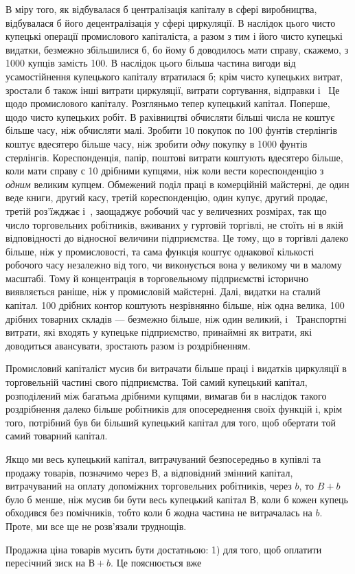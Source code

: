 \parcont{}  %
В міру того, як відбувалася б централізація капіталу в сфері
виробництва, відбувалася б його децентралізація у сфері циркуляції.
В наслідок цього чисто купецькі операції промислового
капіталіста, а разом з тим і його чисто купецькі видатки, безмежно
збільшилися б, бо йому б доводилось мати справу, скажемо,
з 1000 купців замість 100. В наслідок цього більша частина
вигоди від усамостійнення купецького капіталу втратилася б;
крім чисто купецьких витрат, зростали б також інші витрати
циркуляції, витрати сортування, відправки і~ Це щодо промислового
капіталу. Розгляньмо тепер купецький капітал. Поперше,
щодо чисто купецьких робіт. В рахівництві обчисляти
більші числа не коштує більше часу, ніж обчисляти малі. Зробити
10 покупок по 100 фунтів стерлінгів коштує вдесятеро більше
часу, ніж зробити \emph{одну} покупку в 1000 фунтів стерлінгів. Кореспонденція,
папір, поштові витрати коштують вдесятеро більше,
коли мати справу с 10 дрібними купцями, ніж коли вести кореспонденцію
з \emph{одним} великим купцем. Обмежений поділ праці в комерційній
майстерні, де один веде книги, другий касу, третій
кореспонденцію, один купує, другий продає, третій роз’їжджає
і~, заощаджує робочий час у величезних розмірах, так що
число торговельних робітників, вживаних у гуртовій торгівлі,
не стоїть ні в якій відповідності до відносної величини підприємства.
Це тому, що в торгівлі далеко більше, ніж у промисловості,
та сама функція коштує однакової кількості робочого часу
незалежно від того, чи виконується вона у великому чи в малому
масштабі. Тому й концентрація в торговельному підприємстві
історично виявляється раніше, ніж у промисловій майстерні.
Далі, видатки на сталий капітал. 100 дрібних контор коштують
незрівнянно більше, ніж одна велика, 100 дрібних товарних складів
— безмежно більше, ніж один великий, і~ Транспортні витрати,
які входять у купецьке підприємство, принаймні як витрати,
які доводиться авансувати, зростають разом із роздрібненням.

Промисловий капіталіст мусив би витрачати більше праці
і видатків циркуляції в торговельній частині свого підприємства.
Той самий купецький капітал, розподілений між багатьма дрібними
купцями, вимагав би в наслідок такого роздрібнення далеко
більше робітників для опосереднення своїх функцій і, крім
того, потрібний був би більший купецький капітал для того,
щоб обертати той самий товарний капітал.

Якщо ми весь купецький капітал, витрачуваний безпосередньо
в купівлі та продажу товарів, позначимо через $В$, а відповідний
змінний капітал, витрачуваний на оплату допоміжних торговельних
робітників, через $b$, то $B + b$ було б менше, ніж мусив би
бути весь купецький капітал В, коли б кожен купець обходився
без помічників, тобто коли б жодна частина не витрачалась на $b$.
Проте, ми все ще не розв’язали труднощів.

Продажна ціна товарів мусить бути достатньою: 1) для того,
щоб оплатити пересічний зиск на $В + b$. Це пояснюється вже
\parbreak{}  %
